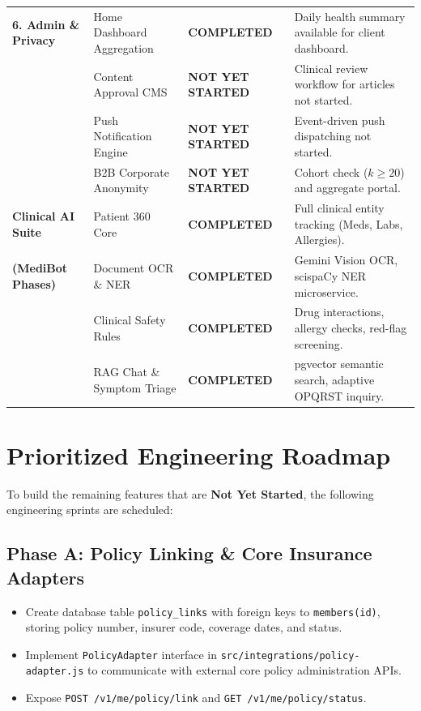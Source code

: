 \documentclass[11pt,a4paper]{article}
\begin{document}
\begin{longtable}{p{4.2cm} p{3.2cm} p{3.2cm} p{4.4cm}}
    \textbf{6. Admin \& Privacy} & Home Dashboard Aggregation & \textcolor{statuscompleted}{\textbf{COMPLETED}} & Daily health summary available for client dashboard. \\
    & Content Approval CMS & \textcolor{statusnotstarted}{\textbf{NOT YET STARTED}} & Clinical review workflow for articles not started. \\
    & Push Notification Engine & \textcolor{statusnotstarted}{\textbf{NOT YET STARTED}} & Event-driven push dispatching not started. \\
    & B2B Corporate Anonymity & \textcolor{statusnotstarted}{\textbf{NOT YET STARTED}} & Cohort check ($k \ge 20$) and aggregate portal. \\
    \midrule

    \textbf{Clinical AI Suite} & Patient 360 Core & \textcolor{statuscompleted}{\textbf{COMPLETED}} & Full clinical entity tracking (Meds, Labs, Allergies). \\
    \textbf{(MediBot Phases)} & Document OCR \& NER & \textcolor{statuscompleted}{\textbf{COMPLETED}} & Gemini Vision OCR, scispaCy NER microservice. \\
    & Clinical Safety Rules & \textcolor{statuscompleted}{\textbf{COMPLETED}} & Drug interactions, allergy checks, red-flag screening. \\
    & RAG Chat \& Symptom Triage & \textcolor{statuscompleted}{\textbf{COMPLETED}} & pgvector semantic search, adaptive OPQRST inquiry. \\
    \bottomrule
\end{longtable}

\newpage

\section{Prioritized Engineering Roadmap}

To build the remaining features that are \textbf{Not Yet Started}, the following engineering sprints are scheduled:

\subsection{Phase A: Policy Linking \& Core Insurance Adapters}
\begin{itemize}[leftmargin=1.5em]
    \item Create database table \texttt{policy\_links} with foreign keys to \texttt{members(id)}, storing policy number, insurer code, coverage dates, and status.
    \item Implement \texttt{PolicyAdapter} interface in \texttt{src/integrations/policy-adapter.js} to communicate with external core policy administration APIs.
    \item Expose \texttt{POST /v1/me/policy/link} and \texttt{GET /v1/me/policy/status}.
\end{itemize}
\end{document}
